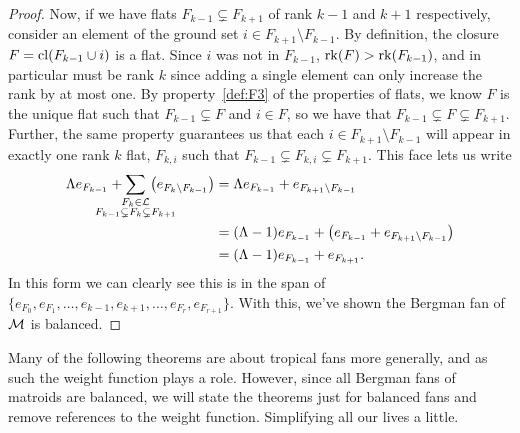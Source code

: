 \documentclass[12pt,oneside]{../../sfsuthesis}
\begin{document}
\begin{proof}
    Now, if we have flats \( F_{k-1} \subsetneq F_{k+1} \) of rank \( k-1 \) and \( k+1 \) respectively, consider an element of the ground set \( i \in F_{k+1} \setminus F_{k-1} \).
    By definition, the closure \( F = \operatorname{cl}(F_{k-1} \cup i) \) is a flat.
    Since \( i \) was not in \( F_{k-1} \), \( \operatorname{rk}(F) > \operatorname{rk}(F_{k-1}) \), and in particular must be rank \( k \) since adding a single element can only increase the rank by at most one.
    By property~\ref{def:F3} of the properties of flats, we know \( F \) is the unique flat such that \( F_{k-1} \subsetneq F \) and \( i \in F \), so we have that \( F_{k-1} \subsetneq F \subsetneq F_{k+1} \).
    Further, the same property guarantees us that each \( i \in F_{k+1} \setminus F_{k-1} \) will appear in exactly one rank \( k \) flat, \( F_{k,i} \) such that \( F_{k-1} \subsetneq F_{k,i} \subsetneq F_{k+1} \).
    This face lets us write
    \begin{align*}
        \Lambda e_{F_{k-1}} + \sum_{\mathclap{\substack{F_k \in \cL                                 \\ F_{k-1} \subsetneq F_k \subsetneq F_{k+1} }}}\, \left( e_{F_k \setminus F_{k-1}} \right)
         & = \Lambda e_{F_{k-1}} + e_{F_{k+1} \setminus F_{k-1}}                                    \\
         & = (\Lambda - 1) e_{F_{k-1}} + \left( e_{F_{k-1}} + e_{F_{k+1} \setminus F_{k-1}} \right) \\
         & = (\Lambda - 1) e_{F_{k-1}} + e_{F_{k+1}}.
    \end{align*}
    In this form we can clearly see this is in the span of \( \{ e_{F_0}, e_{F_1}, \dots, e_{k-1}, e_{k+1}, \dots, e_{F_r}, e_{F_{r+1}} \} \).
    With this, we've shown the Bergman fan of \( \mathcal{M} \) is balanced.
\end{proof}
Many of the following theorems are about tropical fans more generally, and as such the weight function plays a role.
However, since all Bergman fans of matroids are balanced, we will state the theorems just for balanced fans and remove references to the weight function.
Simplifying all our lives a little.

\end{document}
